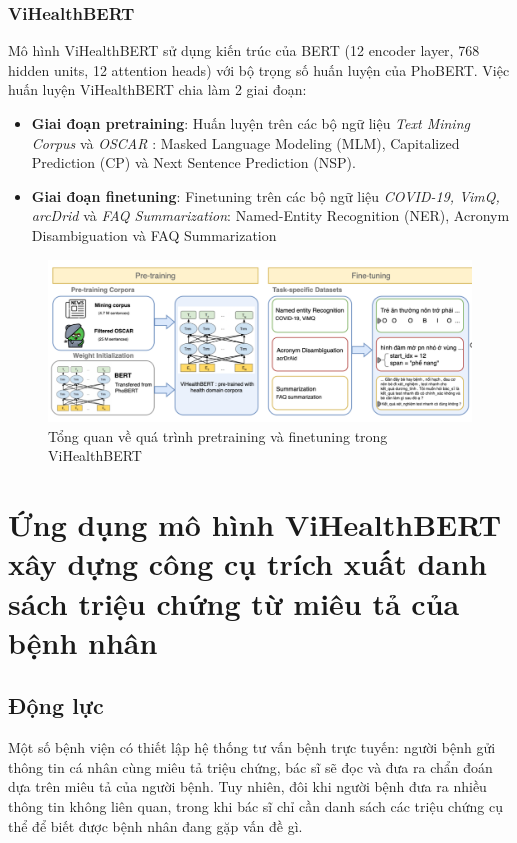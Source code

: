 \documentclass[12pt]{article}
\begin{document}
\subsubsection{ViHealthBERT}
Mô hình ViHealthBERT sử dụng kiến trúc của BERT (12 encoder layer, 768 hidden units, 12 attention heads) với bộ trọng số huấn luyện của PhoBERT. Việc huấn luyện ViHealthBERT chia làm 2 giai đoạn:
\begin{itemize}
\item \textbf{Giai đoạn pretraining}: Huấn luyện trên các bộ ngữ liệu \textit{Text Mining Corpus} và \textit{OSCAR} : Masked Language Modeling (MLM), Capitalized Prediction (CP) và Next Sentence Prediction (NSP).
\item \textbf{Giai đoạn finetuning}: Finetuning trên các bộ ngữ liệu \textit{COVID-19, VimQ, arcDrid} và \textit{FAQ Summarization}: Named-Entity Recognition (NER), Acronym Disambiguation và FAQ Summarization
\end{itemize}
\begin{figure}
\begin{center}
\includegraphics[scale=.8]{img/ViHealthBERT.png}
\caption{Tổng quan về quá trình pretraining và finetuning trong ViHealthBERT\cite{minh-EtAl:2022:LREC}}
\end{center}
\end{figure}

\section{Ứng dụng mô hình ViHealthBERT xây dựng công cụ trích xuất danh sách triệu chứng từ miêu tả của bệnh nhân}
\subsection{Động lực}
Một số bệnh viện có thiết lập hệ thống tư vấn bệnh trực tuyến: người bệnh gửi thông tin cá nhân cùng miêu tả triệu chứng, bác sĩ sẽ đọc và đưa ra chẩn đoán dựa trên miêu tả của người bệnh. Tuy nhiên, đôi khi người bệnh đưa ra nhiều thông tin không liên quan, trong khi bác sĩ chỉ cần danh sách các triệu chứng cụ thể để biết được bệnh nhân đang gặp vấn đề gì.
\end{document}
